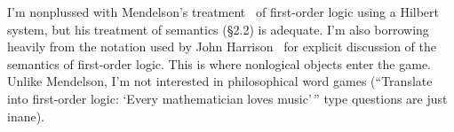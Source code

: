 \begin{node}\label{fol-0000}%
I'm nonplussed with Mendelson's treatment~\cite{mendelson2015mathematical}
of first-order logic using a Hilbert system, but his treatment of
semantics (\S2.2) is adequate. I'm also borrowing heavily from the
notation used by John Harrison~\cite{harrison2009handbook} for explicit
discussion of the semantics of first-order logic. This is where nonlogical
objects enter the game. Unlike Mendelson, I'm not interested in
philosophical word games (``Translate into first-order logic: `Every
mathematician loves music'\,'' type questions are just inane).
\end{node}

